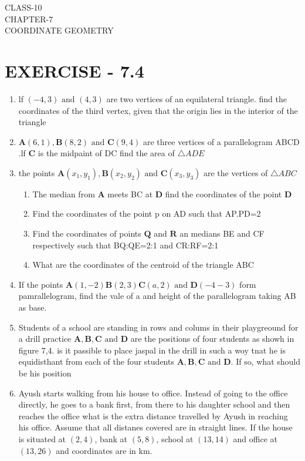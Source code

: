 \documentclass[12pt]{article}
\let\vec\mathbf
\begin{document}
\begin{center}
\textbf\large{CLASS-10\\CHAPTER-7 \\ COORDINATE GEOMETRY}
\end{center}

\section*{EXERCISE - 7.4}

\begin{enumerate}
\item lf $(-4,3)\text{ and }(4,3)$ are two vertices of an equilateral triangle. find the coordinates of the third vertex, given that the origin lies in the interior of the triangle 
\item $\vec{A} (6,1),\vec{B}(8,2) \text{ and } \vec{C}(9,4)$ are three vertices of a parallelogram ABCD .lf $\vec{C}$ is the midpaint of DC find the area of $\triangle ADE$
\item the points $\vec{A} (x_1,y_1),\vec{B}(x_2,y_2)\text{ and } \vec{C} (x_3,y_3) $ are the vertices of $\triangle ABC$
	\begin{enumerate}	
		\item The median from $\vec{A}$ meets BC at $\vec{D}$ find the coordinates of the point $\vec{D}$
		\item Find the coordinates of the point p  on AD such that AP.PD=2
\item Find the coordinates of points $\vec{Q}$ and $\vec{R}$ an medians BE and CF respectively such that BQ:QE=2:1 and CR:RF=2:1
\item What are the coordinates of the centroid of the triangle ABC
	\end{enumerate}
\item If the points  $\vec{A} (1,-2) \vec{B}(2,3) \vec{C}(a,2)\text{ and }\vec{D} (-4-3)$ form pamrallelogram, find the vale of a and height of the parallelogram taking AB as base.
\item Students of a school are standing in rows and colums in their playgreound for a drill practice $\vec{A},\vec{B},\vec{C} \text{ and } \vec{D}$ are the positions of four students as showh in figure 7,4. is it passible to place jaspal in the drill in such a woy tnat he is equidisthant from each of the four students $\vec{A},\vec{B},\vec{C} \text{ and } \vec{D}$. If so, what should be his position 
\item Ayush starts walking from his house to office. Instead of going to the office directly, he goes to a bank first, from there to his daughter school and then reaches the office what is the extra distance travelled by Ayush in reaching his office. Assume that all distanes covered are in straight lines. If the house is situated at $(2,4)$, bank at $(5,8)$, school at $(13,14)$ and office at $(13,26)$ and coordinates are in km.


\end{enumerate}
\end{document}
